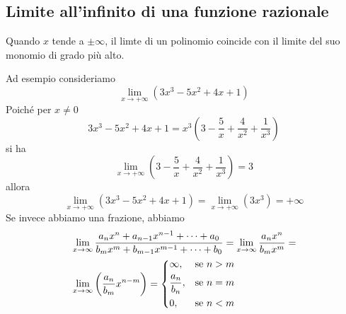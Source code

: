 \subsection{Limite all'infinito di una funzione razionale}
\hypertarget{teor:limiteInfinitoFunzRaz}{}
\begin{limiteInfinitoFunzRaz}
  Quando $x$ tende a $\pm\infty$, il limte di un polinomio coincide con il limite del suo monomio di
  grado più alto.
\end{limiteInfinitoFunzRaz}
Ad esempio consideriamo
\begin{equation*}
  \lim\limits_{x\to+\infty}(3x^3-5x^2+4x+1)
\end{equation*}
Poiché per $x\neq0$
\begin{equation*}
  3x^3-5x^2+4x+1=x^3\left(3-\frac{5}{x}+\frac{4}{x^2}+\frac{1}{x^3}\right)
\end{equation*}
si ha
\begin{equation*}
  \lim\limits_{x\to+\infty}\left(3-\frac{5}{x}+\frac{4}{x^2}+\frac{1}{x^3}\right) = 3
\end{equation*}
allora
\begin{equation*}
  \lim\limits_{x\to+\infty}(3x^3-5x^2+4x+1)=\lim\limits_{x\to+\infty}(3x^3) = +\infty
\end{equation*}
Se invece abbiamo una frazione, abbiamo
\begin{align*}
  &\lim\limits_{x\to\infty}\frac{a_nx^n+a_{n-1}x^{n-1}+\dotsb+a_0}{b_mx^m+b_{m-1}x^{m-1}+\dotsb+b_0}=
  \lim\limits_{x\to\infty}\frac{a_nx^n}{b_mx^m} = \\
  &\lim\limits_{x\to\infty}\left(\frac{a_n}{b_m}x^{n-m}\right) =
  \begin{dcases}
    \infty, &\text{se } n > m\\
    \frac{a_n}{b_n}, &\text{se } n = m\\
    0, &\text{se } n < m
  \end{dcases}
\end{align*}

